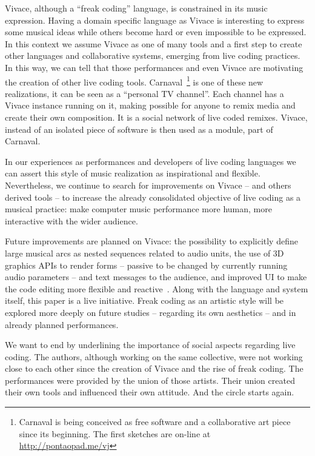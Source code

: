 \documentclass[letterpaper, 12pt]{article}
\begin{document}
Vivace, although a ``freak coding'' language, is constrained in its
music expression. Having a domain specific language as Vivace is
interesting to express some musical ideas while others become hard or
even impossible to be expressed. In this context we assume Vivace as
one of many tools and a first step to create other languages and
collaborative systems, emerging from live coding practices. In this
way, we can tell that those performances and even Vivace are
motivating the creation of other live coding
tools. Carnaval~\footnote{Carnaval is being conceived as free software
  and a collaborative art piece since its beginning. The first
  sketches are on-line at \url{http://pontaopad.me/vj}} is one of
these new realizations, it can be seen as a ``personal TV
channel''. Each channel has a Vivace instance running on it, making
possible for anyone to remix media and create their own
composition. It is a social network of live coded remixes. Vivace,
instead of an isolated piece of software is then used as a module,
part of Carnaval.

In our experiences as performances and developers of live coding
languages we can assert this style of music realization as
inspirational and flexible. Nevertheless, we continue to search for
improvements on Vivace -- and others derived tools -- to increase the
already consolidated objective of live coding as a musical practice:
make computer music performance more human, more interactive with the
wider audience.

Future improvements are planned on Vivace: the possibility to
explicitly define large musical arcs as nested sequences related to
audio units, the use of 3D graphics APIs to render forms -- passive to
be changed by currently running audio parameters -- and text messages
to the audience, and improved UI to make the code editing more
flexible and reactive~\citep*{brett}.  Along with the language and
system itself, this paper is a live initiative. Freak coding as an
artistic style will be explored more deeply on future studies --
regarding its own aesthetics -- and in already planned performances.

We want to end by underlining the importance of social aspects
regarding live coding. The authors, although working on the same
collective, were not working close to each other since the creation of
Vivace and the rise of freak coding. The performances were provided by
the union of those artists. Their union created their own tools and
influenced their own attitude. And the circle starts again.



\end{document}
